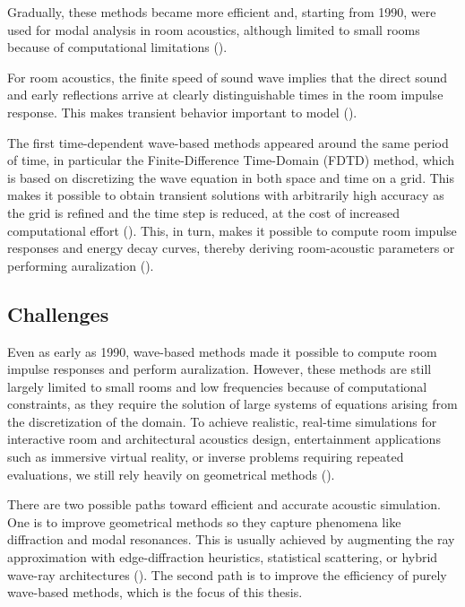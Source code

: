 \documentclass{Configuration_Files/PoliMi3i_thesis}
\begin{document}
Gradually, these methods became more efficient and, starting from 1990, were used for modal analysis in room acoustics, although limited to small rooms because of computational limitations (\cite{rindel_computer_1992}).

For room acoustics, the finite speed of sound wave implies that the direct sound and early reflections arrive at clearly distinguishable times in the room impulse response. This makes transient behavior important to model (\cite{funkhouser_beam_1998}).

The first time-dependent wave-based methods appeared around the same period of time, in particular the Finite-Difference Time-Domain (FDTD) method, which is based on discretizing the wave equation in both space and time on a grid. This makes it possible to obtain transient solutions with arbitrarily high accuracy as the grid is refined and the time step is reduced, at the cost of increased computational effort (\cite{alterman_propagation_1968,ottaviani_elastic-wave_1971,alford_accuracy_1974}). This, in turn, makes it possible to compute room impulse responses and energy decay curves, thereby deriving room-acoustic parameters or performing auralization (\cite{botteldooren_finitedifference_1995}).

\subsection{Challenges}
Even as early as 1990, wave-based methods made it possible to compute room impulse responses and perform auralization. However, these methods are still largely limited to small rooms and low frequencies because of computational constraints, as they require the solution of large systems of equations arising from the discretization of the domain. To achieve realistic, real-time simulations for interactive room and architectural acoustics design, entertainment applications such as immersive virtual reality, or inverse problems requiring repeated evaluations, we still rely heavily on geometrical methods (\cite{kleiner_auralization_1993,council_virtual_1995,savioja_creating_1999,sampedro_llopis_reduced_2023}).

There are two possible paths toward efficient and accurate acoustic simulation. One is to improve geometrical methods so they capture phenomena like diffraction and modal resonances. This is usually achieved by augmenting the ray approximation with edge-diffraction heuristics, statistical scattering, or hybrid wave-ray architectures (\cite{calamia_fast_2006,an_diffraction-aware_2018,potter_numerical_2023,yeh_wave-ray_2013,tang_learning_2021}). The second path is to improve the efficiency of purely wave-based methods, which is the focus of this thesis.
%
\end{document}
